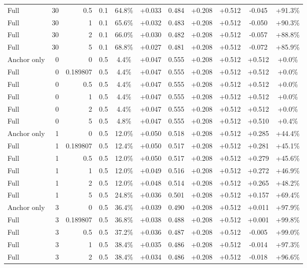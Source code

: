 \begin{table}[htbp]
\begin{tabular}{lrrrccccccc}
Full & 30 & 0.5 & 0.1 & 64.8\% & +0.033 & 0.484 & +0.208 & +0.512 & -0.045 & +91.3\% \\
Full & 30 & 1 & 0.1 & 65.6\% & +0.032 & 0.483 & +0.208 & +0.512 & -0.050 & +90.3\% \\
Full & 30 & 2 & 0.1 & 66.0\% & +0.030 & 0.482 & +0.208 & +0.512 & -0.057 & +88.8\% \\
Full & 30 & 5 & 0.1 & 68.8\% & +0.027 & 0.481 & +0.208 & +0.512 & -0.072 & +85.9\% \\
Anchor only & 0 & 0 & 0.5 & 4.4\% & +0.047 & 0.555 & +0.208 & +0.512 & +0.512 & +0.0\% \\
Full & 0 & 0.189807 & 0.5 & 4.4\% & +0.047 & 0.555 & +0.208 & +0.512 & +0.512 & +0.0\% \\
Full & 0 & 0.5 & 0.5 & 4.4\% & +0.047 & 0.555 & +0.208 & +0.512 & +0.512 & +0.0\% \\
Full & 0 & 1 & 0.5 & 4.4\% & +0.047 & 0.555 & +0.208 & +0.512 & +0.512 & +0.0\% \\
Full & 0 & 2 & 0.5 & 4.4\% & +0.047 & 0.555 & +0.208 & +0.512 & +0.512 & +0.0\% \\
Full & 0 & 5 & 0.5 & 4.8\% & +0.047 & 0.555 & +0.208 & +0.512 & +0.510 & +0.4\% \\
Anchor only & 1 & 0 & 0.5 & 12.0\% & +0.050 & 0.518 & +0.208 & +0.512 & +0.285 & +44.4\% \\
Full & 1 & 0.189807 & 0.5 & 12.4\% & +0.050 & 0.517 & +0.208 & +0.512 & +0.281 & +45.1\% \\
Full & 1 & 0.5 & 0.5 & 12.0\% & +0.050 & 0.517 & +0.208 & +0.512 & +0.279 & +45.6\% \\
Full & 1 & 1 & 0.5 & 12.0\% & +0.049 & 0.516 & +0.208 & +0.512 & +0.272 & +46.9\% \\
Full & 1 & 2 & 0.5 & 12.0\% & +0.048 & 0.514 & +0.208 & +0.512 & +0.265 & +48.2\% \\
Full & 1 & 5 & 0.5 & 24.8\% & +0.036 & 0.501 & +0.208 & +0.512 & +0.157 & +69.4\% \\
Anchor only & 3 & 0 & 0.5 & 36.4\% & +0.039 & 0.490 & +0.208 & +0.512 & +0.011 & +97.9\% \\
Full & 3 & 0.189807 & 0.5 & 36.8\% & +0.038 & 0.488 & +0.208 & +0.512 & +0.001 & +99.8\% \\
Full & 3 & 0.5 & 0.5 & 37.2\% & +0.036 & 0.487 & +0.208 & +0.512 & -0.005 & +99.0\% \\
Full & 3 & 1 & 0.5 & 38.4\% & +0.035 & 0.486 & +0.208 & +0.512 & -0.014 & +97.3\% \\
Full & 3 & 2 & 0.5 & 38.4\% & +0.034 & 0.486 & +0.208 & +0.512 & -0.018 & +96.6\% \\

\end{tabular}
\end{table}
